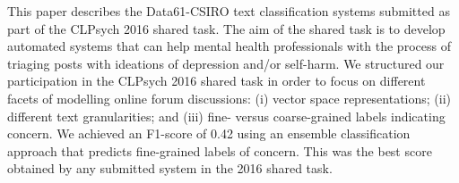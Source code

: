 This paper describes the Data61-CSIRO text classification systems submitted as part of the CLPsych 2016 shared task. The aim of the shared task is to develop automated systems that can help mental health professionals with the process of triaging posts with ideations of depression and/or self-harm. We structured our participation in the CLPsych 2016 shared task in order to focus on different facets of modelling online forum discussions: (i) vector space representations; (ii) different text granularities; and (iii) fine- versus coarse-grained labels indicating concern. We achieved an F1-score of 0.42 using an ensemble classification approach that predicts fine-grained labels of concern. This was the best score obtained by any submitted system in the 2016 shared task.
